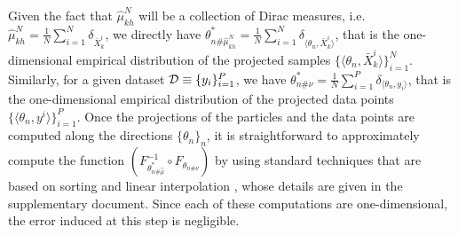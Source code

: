 Given the fact that $\hat{\mu}^N_{kh}$ will be a collection of Dirac measures, i.e.\ $\hat{\mu}^N_{kh} = \frac1{N} \sum_{i=1}^N \delta_{\bar{X}_{k}^i}$, we directly have $\theta_{n\#\hat{\mu}^N_{kh}}^* = \frac1{N} \sum_{i=1}^N \delta_{\langle \theta_n, \bar{X}_{k}^i \rangle} $, that is the one-dimensional empirical distribution of the projected samples $\{\langle \theta_n, \bar{X}_{k}^i \rangle\}_{i=1}^N$. Similarly, for a given dataset ${\cal D} \equiv \{y_i\}_{i=1}^P$, we have $\theta_{n\#\nu}^* = \frac1{N} \sum_{i=1}^P \delta_{\langle \theta_n, y_i \rangle} $, that is the one-dimensional empirical distribution of the projected data points $\{\langle \theta_n, y^i \rangle\}_{i=1}^P$. Once the projections of the particles and the data points are computed along the directions $\{\theta_n\}_n$, it is straightforward to approximately compute the function $(F_{\theta_{n\#\hat{\mu}}^*}^{-1} \circ F_{\theta_{n\#\nu}}) $ by using standard techniques that are based on sorting and linear interpolation , whose details are given in the supplementary document. Since each of these computations are one-dimensional, the error induced at this step is negligible. 











